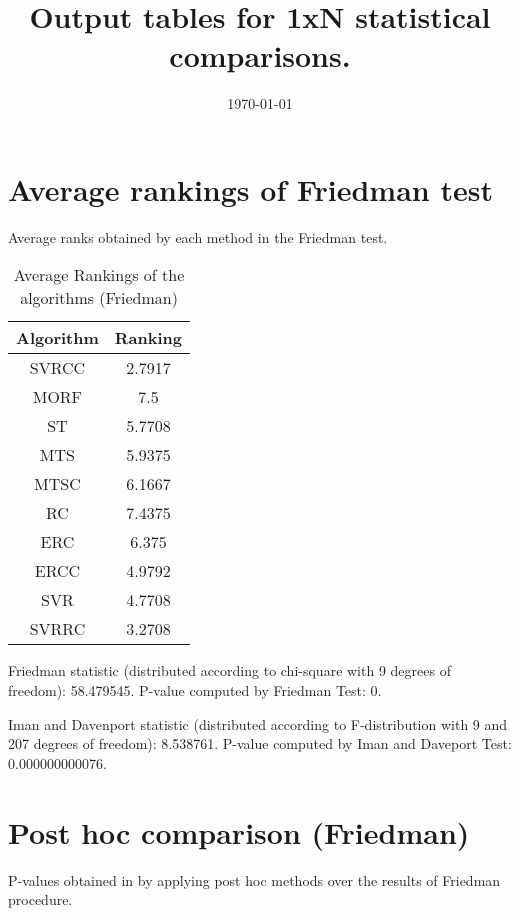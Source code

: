 \documentclass[a4paper,10pt]{article}
\title{Output tables for 1xN statistical comparisons.}
\author{}
\date{\today}
\begin{document}
\begin{landscape}
\pagestyle{empty}
\maketitle
\thispagestyle{empty}

\section{Average rankings of Friedman test}


Average ranks obtained by each method in the Friedman test.

\begin{table}[!htp]
\centering
\begin{tabular}{|c|c|}\hline
Algorithm&Ranking\\\hline
SVRCC&2.7917\\MORF&7.5\\ST&5.7708\\MTS&5.9375\\MTSC&6.1667\\RC&7.4375\\ERC&6.375\\ERCC&4.9792\\SVR&4.7708\\SVRRC&3.2708\\\hline\end{tabular}
\caption{Average Rankings of the algorithms (Friedman)}
\end{table}

Friedman statistic (distributed according to chi-square with 9 degrees of freedom): 58.479545. \newline P-value computed by Friedman Test: 0.\newline

Iman and Davenport statistic (distributed according to F-distribution with 9 and 207 degrees of freedom): 8.538761. \newline P-value computed by Iman and Daveport Test: 0.000000000076.\newline


\newpage

\section{Post hoc comparison (Friedman)}


P-values obtained in by applying post hoc methods over the results of Friedman procedure.


\end{landscape}
\end{document}
